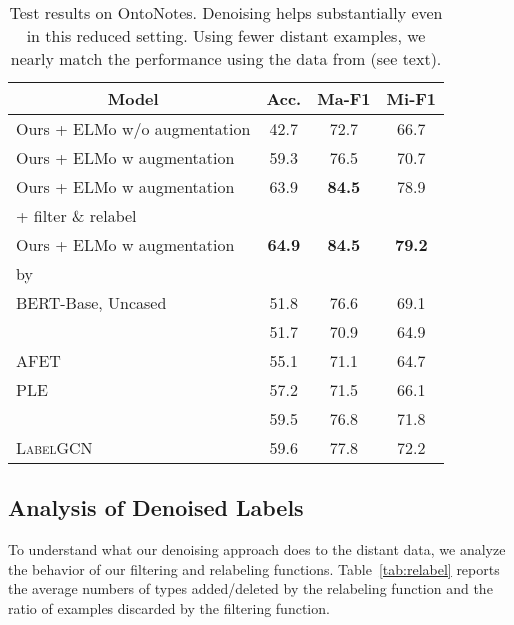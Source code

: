 \documentclass[11pt,a4paper]{article}
\begin{document}
\renewcommand{\arraystretch}{1}
\begin{table}[t]
	\centering
	\vspace{-18pt}
	\small
	\setlength{\tabcolsep}{4pt}
\begin{tabular}{lccc}
\toprule
		\multicolumn{1}{c}{Model}
		 &{Acc.} & {Ma-F1}& {Mi-F1} \\
		\midrule
		Ours + ELMo w/o augmentation & 42.7 & 72.7  & 66.7\\
		Ours + ELMo w augmentation & 59.3 & 76.5 & 70.7\\
		Ours + ELMo w augmentation & 63.9 & \textbf{84.5} & 78.9\\
		\hspace{48pt} + filter \& relabel  & & \\
		Ours + ELMo w augmentation & \textbf{64.9} & \textbf{84.5} & \textbf{79.2}\\
		\hspace{40pt} by \citet{Eunsol_Choi_18}  &  &  \\
		BERT-Base, Uncased  & 51.8 & 76.6 & 69.1 \\
		\midrule
		\citet{Sonse_Shimaoka_17} & 51.7 & 70.9 & 64.9\\
	    AFET \cite{Xiang_Ren_16a} & 55.1 & 71.1 & 64.7 \\
	    PLE \cite{Xiang_Ren_16b} & 57.2 & 71.5 & 66.1 \\
		\citet{Eunsol_Choi_18} & 59.5 & 76.8 & 71.8 \\
		\textsc{LabelGCN} \cite{Wenhan_Xiong_2019} & 59.6 & 77.8 & 72.2\\
		\bottomrule 
	\end{tabular}
\caption{Test results on OntoNotes. Denoising helps substantially even in this reduced setting. Using fewer distant examples, we nearly match the performance using the data from \citet{Eunsol_Choi_18} (see text).}
	\label{tab:onto-test}
\end{table}






\subsection{Analysis of Denoised Labels}

To understand what our denoising approach does to the distant data, we analyze the behavior of our filtering and relabeling functions. Table~\ref{tab:relabel} reports the average numbers of types added/deleted by the relabeling function and the ratio of examples discarded by the filtering function.
\end{document}
